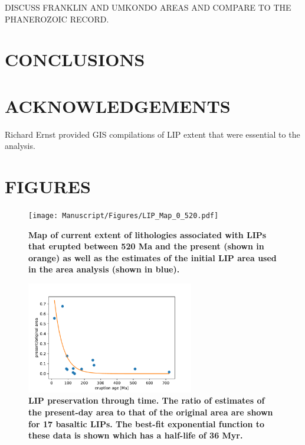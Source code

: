 \documentclass[11pt,letterpaper]{article}
\begin{document}
DISCUSS FRANKLIN AND UMKONDO AREAS AND COMPARE TO THE PHANEROZOIC RECORD. 

\section*{CONCLUSIONS}

\section*{ACKNOWLEDGEMENTS \label{sec:ACKNOWLEDGEMENTS}}

Richard Ernst provided GIS compilations of LIP extent that were essential to the analysis.

\section*{FIGURES}

\begin{figure}[h!]
\begin{center}
	\texttt{[image: Manuscript/Figures/LIP\_Map\_0\_520.pdf]}
	\caption{\textbf{Map of current extent of lithologies associated with LIPs that erupted between 520 Ma and the present (shown in orange) as well as the estimates of the initial LIP area used in the area analysis (shown in blue).}}
	\label{fig:LIP_map}
\end{center}
\end{figure}

\begin{figure}[h!]
\begin{center}
	\includegraphics[width=0.65\textwidth]{Manuscript/Figures/LIP_Preservation.pdf}
	\caption{\textbf{LIP preservation through time. The ratio of estimates of the present-day area to that of the original area are shown for 17 basaltic LIPs. The best-fit exponential function to these data is shown which has a half-life of 36 Myr.}}
	\label{fig:LIP_preservation}
\end{center}
\end{figure}
\end{document}
